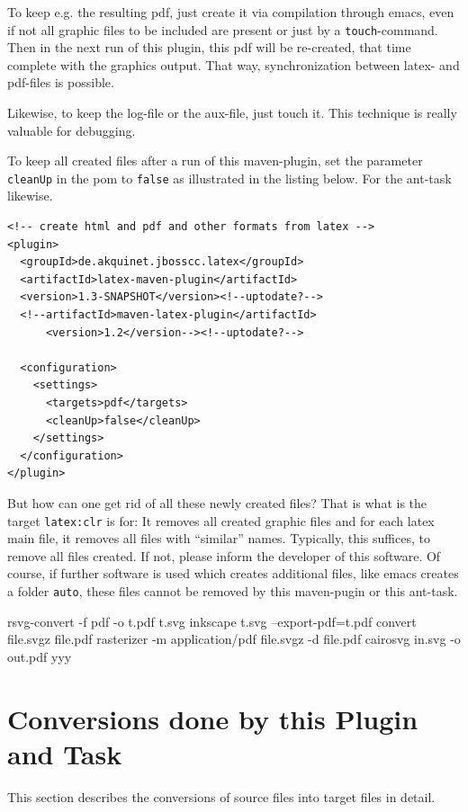 \documentclass[12pt]{article}
\begin{document}
To keep e.g. the resulting pdf, 
just create it via compilation through emacs, 
even if not all graphic files to be included are present 
or just by a {\tt touch}-command. 
Then in the next run of this plugin, 
this pdf will be re-created, 
that time complete with the graphics output. 
That way, synchronization between latex- and pdf-files is possible. 

Likewise, to keep the log-file or the aux-file, just touch it. 
This technique is really valuable for debugging. 

To keep all created files after a run of this maven-plugin, 
set the parameter {\tt cleanUp} in the pom 
to {\tt false} as illustrated in the listing below. 
For the ant-task likewise. 
%
\lstset{language=xml, basicstyle=\small}
\begin{lstlisting}
<!-- create html and pdf and other formats from latex -->
<plugin>
  <groupId>de.akquinet.jbosscc.latex</groupId>
  <artifactId>latex-maven-plugin</artifactId>
  <version>1.3-SNAPSHOT</version><!--uptodate?-->
  <!--artifactId>maven-latex-plugin</artifactId>
      <version>1.2</version--><!--uptodate?-->
	
  <configuration>
    <settings>
      <targets>pdf</targets>
      <cleanUp>false</cleanUp>
    </settings>
  </configuration>
</plugin>
\end{lstlisting}


But how can one get rid of all these newly created files? 
That is what is the target {\tt latex:clr} is for: 
It removes all created graphic files 
and for each latex main file, it removes all files with ``similar'' names. 
Typically, this suffices, to remove all files created. 
If not, please inform the developer of this software. 
Of course, if further software is used which creates additional files, 
like emacs creates a folder {\tt auto}, 
these files cannot be removed by this maven-pugin or this ant-task. 


rsvg-convert -f pdf -o t.pdf t.svg
inkscape t.svg --export-pdf=t.pdf
convert file.svgz file.pdf 
rasterizer -m application/pdf file.svgz -d file.pdf
cairosvg in.svg -o out.pdf
yyy

\section{Conversions done by this Plugin and Task}\label{sec:conversions}

This section describes the conversions of source files into target files 
in detail. 
\end{document}

